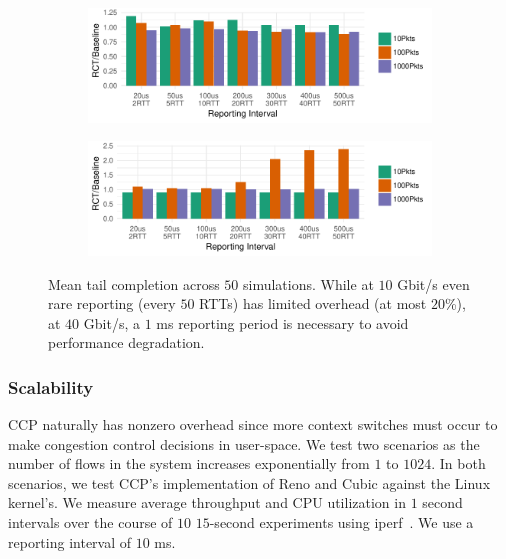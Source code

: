 \begin{figure}
    \centering
    \begin{subfigure}{\columnwidth}
    \centering
    \includegraphics[width=\columnwidth]{img/10g-rct}
    \label{fig:eval:lowrtt:10g}
    \end{subfigure}
    \begin{subfigure}{\columnwidth}
    \centering
    \includegraphics[width=\columnwidth]{img/40g-rct}
    \label{fig:eval:lowrtt:40g}
    \end{subfigure}
    \caption{Mean tail completion across $50$ simulations. While at $10$ Gbit/s even rare reporting (every $50$ RTTs) has limited overhead (at most $20$\%), at $40$ Gbit/s, a $1$ ms reporting period is necessary to avoid performance degradation.}
    \label{fig:eval:lowrtt}
\end{figure}

\subsubsection{Scalability}
\label{sec:eval:whyfold:scale}

CCP naturally has nonzero overhead since more context switches must occur to make congestion control decisions in user-space.
We test two scenarios as the number of flows in the system increases exponentially from $1$ to $1024$.
In both scenarios, we test CCP's implementation of Reno and Cubic against the Linux kernel's. We measure average throughput and CPU utilization in $1$ second intervals over the course of $10$ $15$-second experiments using iperf~\cite{iperf}. We use a reporting interval of $10$ ms.

